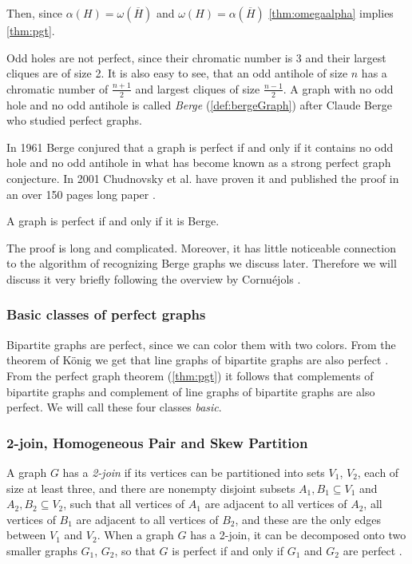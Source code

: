 
Then, since $\alpha(H) = \omega(\overline{H})$ and $\omega(H) = \alpha(\overline{H})$ \cref{thm:omegaalpha} implies \cref{thm:pgt}.

Odd holes are not perfect, since their chromatic number is 3 and their largest cliques are of size 2. It is also easy to see, that an odd antihole of size $n$ has a chromatic number of $\frac{n+1}{2}$ and largest cliques of size $\frac{n-1}{2}$. A graph with no odd hole and no odd antihole is called \emph{Berge} (\cref{def:bergeGraph}) after Claude Berge who studied perfect graphs.

In 1961 Berge conjured that a graph is perfect if and only if it contains no odd hole and no odd antihole in what has become known as a strong perfect graph conjecture. In 2001 Chudnovsky et al. have proven it and published the proof in an over 150 pages long paper  \cite{MC06}.

\begin{theorem}
	\label{thm:spgt}
	A graph is perfect if and only if it is Berge.
\end{theorem}

The proof is long and complicated. Moreover, it has little noticeable connection to the algorithm of recognizing Berge graphs we discuss later. Therefore we will discuss it very briefly following the overview by Cornuéjols \cite{GC03}.

\subsubsection{Basic classes of perfect graphs}
Bipartite graphs are perfect, since we can color them with two colors. From the theorem of König we get that line graphs of bipartite graphs are also perfect \cite{Knig1916, GC03}. From the perfect graph theorem (\cref{thm:pgt}) it follows that complements of bipartite graphs and complement of line graphs of bipartite graphs are also perfect. We will call these four classes \emph{basic}.

\subsubsection{2-join, Homogeneous Pair and Skew Partition}
A graph $G$ has a \emph{2-join} if its vertices can be partitioned into sets $V_1$, $V_2$, each of size at least three, and there are nonempty disjoint subsets $A_1, B_1 \subseteq V_1$ and $A_2, B_2 \subseteq V_2$, such that all vertices of $A_1$ are adjacent to all vertices of $A_2$, all vertices of $B_1$ are adjacent to all vertices of $B_2$, and these are the only edges between $V_1$ and $V_2$. When a graph $G$ has a 2-join, it can be decomposed onto two smaller graphs $G_1$, $G_2$, so that $G$ is perfect if and only if $G_1$ and $G_2$ are perfect \cite{Cornujols1985}.

